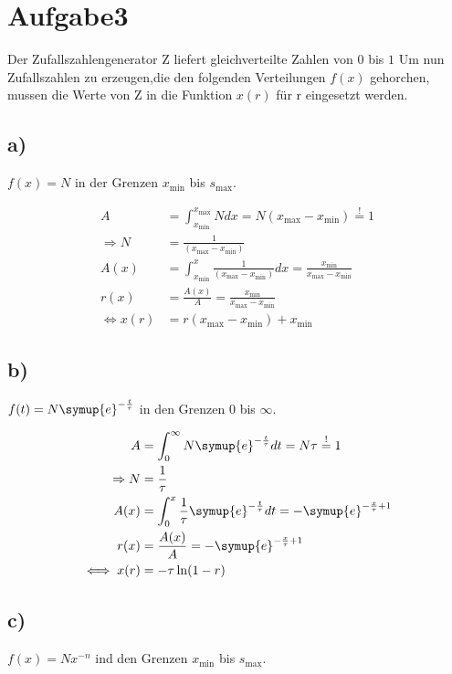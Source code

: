 \newpage
\section{Aufgabe3}
\label{sec:a3}
Der Zufallszahlengenerator Z liefert gleichverteilte Zahlen von $0$ bis $1$
Um nun Zufallszahlen zu erzeugen,die den folgenden Verteilungen $f(x)$ gehorchen,
mussen die Werte von Z in die Funktion $x(r)$ für r eingesetzt werden. 


\subsection{a)}
\label{subsec:a3a}
$f(x)=N$ in der Grenzen $x_\text{min}$ bis $s_\text{max}$.

\begin{align}
A&=\int_{x_\text{min}}^{x_\text{max}} N dx=
N(x_\text{max}-x_\text{min})\stackrel{!}{=}1\\
\Rightarrow N&=\frac{1}{(x_\text{max}-x_\text{min})}\\
A(x)&=\int_{x_\text{min}}^{x}\frac{1}{(x_\text{max}-x_\text{min})}dx=\frac{x_\text{min}}{x_\text{max}-x_\text{min}}\\
r(x)&=\frac{A(x)}{A}=\frac{x_\text{min}}{x_\text{max}-x_\text{min}}\\
\iff x(r)&=r(x_\text{max}-x_\text{min})+x_\text{min}
\end{align}


\subsection{b)}
\label{subsec:a3b}
$f(t)=N\symup{e}^{-\frac{t}{\tau}}$ in den Grenzen $0$ bis $\infty$.

\begin{align}
A&=\int_0^{\infty}N\symup{e}^{-\frac{t}{\tau}}dt=N\tau\stackrel{!}{=}1\\
\Rightarrow N&=\frac{1}{\tau}\\
A(x)&=\int_0^x \frac{1}{\tau}\symup{e}^{-\frac{t}{\tau}}dt=-\symup{e}^{-\frac{x}{\tau}+1}\\
r(x)&=\frac{A(x)}{A}=-\symup{e}^{-\frac{x}{\tau}+1}\\
\iff x(r)&=-\tau\ln(1-r)
\end{align}

\subsection{c)}
\label{subsec:a3c}
$f(x)=Nx^{-n}$ ind den Grenzen  $x_\text{min}$ bis $s_\text{max}$.

